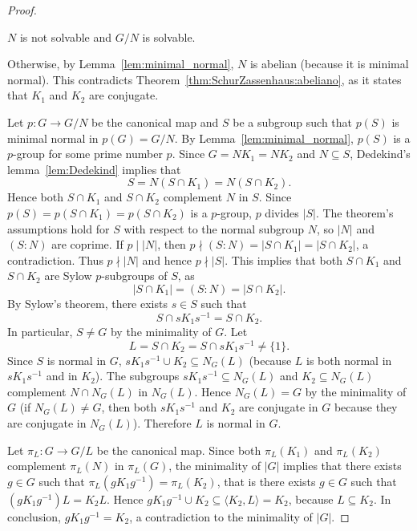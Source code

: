 \begin{proof}
	\begin{claim}
		$N$ is not solvable and $G/N$ is solvable. 
	\end{claim}
	
	Otherwise, by Lemma~\ref{lem:minimal_normal}, $N$ is abelian (because it is minimal normal). This contradicts
    Theorem~\ref{thm:SchurZassenhaus:abeliano}, as it states that 
	$K_1$ and $K_2$ are conjugate. 
 
	\medskip
	Let $p\colon G\to G/N$ be the canonical map and $S$ be a subgroup such that $p(S)$
	is minimal normal in $p(G)=G/N$.  By Lemma~\ref{lem:minimal_normal},
	$p(S)$ is a $p$-group for some prime number $p$. Since $G=NK_1=NK_2$ and $N\subseteq
	S$, Dedekind's lemma~\ref{lem:Dedekind} implies that 
	\[
	S=N(S\cap K_1)=N(S\cap K_2).
	\]
	Hence both $S\cap K_1$ and $S\cap K_2$
	complement $N$ in $S$. Since $p(S)=p(S\cap K_1)=p(S\cap K_2)$  is a $p$-group, 
 	$p$ divides $|S|$. The theorem's assumptions hold for $S$ with respect to the normal subgroup $N$, 
    so $|N|$ and $(S:N)$ are coprime. If $p\mid |N|$, then 
	$p\nmid (S:N)=|S\cap K_1|=|S\cap K_2|$, a contradiction. Thus $p\nmid |N|$ and 
	hence $p\nmid |S|$. This implies that both $S\cap K_1$ and $S\cap K_2$ are Sylow 
	$p$-subgroups of $S$, as 
	\[
		|S\cap K_1|=(S:N)=|S\cap K_2|.
	\]
	By Sylow's theorem, there exists $s\in
	S$ such that 
    \[
	S\cap sK_1s^{-1}=S\cap K_2.
	\]
	In particular, $S\ne G$ by the minimality of $G$.
	Let 
	\[
		L=S\cap K_2=S\cap sK_1s^{-1}\ne\{1\}.
	\]
	Since $S$ is normal in $G$, $sK_1s^{-1}\cup K_2\subseteq N_G(L)$ (because $L$
	is both normal in $sK_1s^{-1}$ and in $K_2$). The subgroups $sK_1s^{-1}\subseteq
	N_G(L)$ and $K_2\subseteq N_G(L)$ complement $N\cap N_G(L)$ in $N_G(L)$. Hence 
	$N_G(L)=G$ by the minimality of $G$ (if $N_G(L)\ne G$, then both 
	$sK_1s^{-1}$ and $K_2$ are conjugate in $G$ because they are conjugate in  $N_G(L)$). Therefore 
	$L$ is normal in $G$. 
	
	Let $\pi_L\colon G\to G/L$ be the canonical map. Since both 
	$\pi_L(K_1)$ and $\pi_L(K_2)$ complement $\pi_L(N)$ in $\pi_L(G)$, the minimality of 
	$|G|$ implies that there exists $g\in G$ such that $\pi_L(gK_1g^{-1})=\pi_L(K_2)$, that is 
	there exists $g\in G$ such that $(gK_1g^{-1})L=K_2L$.  Hence $gK_1g^{-1}\cup
	K_2\subseteq \langle K_2,L\rangle=K_2$, because $L\subseteq K_2$. In conclusion, 
	$gK_1g^{-1}=K_2$, a contradiction to the minimality of $|G|$. 
%
\end{proof}


